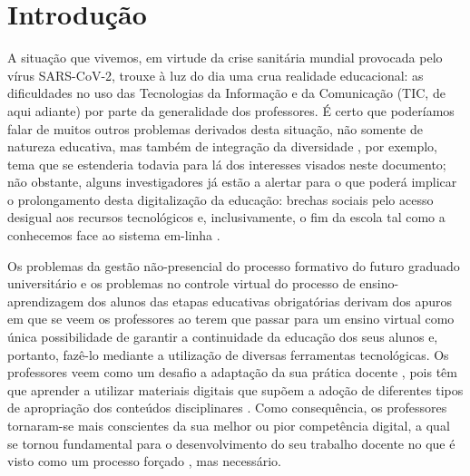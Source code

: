 \documentclass{textolivre}
\begin{document}
\section{Introdução}\label{sec-intro}
A situação que vivemos, em virtude da crise sanitária mundial provocada pelo
vírus SARS-CoV-2, trouxe à luz do dia uma crua realidade educacional: as
dificuldades no uso das Tecnologias da Informação e da Comunicação (TIC, de
aqui adiante) por parte da generalidade dos professores. É certo que poderíamos
falar de muitos outros problemas derivados desta situação, não somente de
natureza educativa, mas também de integração da diversidade \cite{rodriguezdelrincon2020},
por exemplo, tema que se estenderia todavia para lá dos interesses visados
neste documento; não obstante, alguns investigadores já estão a alertar para o
que poderá implicar o prolongamento desta digitalização da educação: brechas
sociais pelo acesso desigual aos recursos tecnológicos \cite{almazan2020,jimenez2020,rogerogarcia2020}
e, inclusivamente, o fim da escola tal como a
conhecemos face ao sistema em-linha \cite{feitoAlonso2020}.

Os problemas da gestão não-presencial do processo formativo do futuro graduado
universitário e os problemas no controle virtual do processo de
ensino-aprendizagem dos alunos das etapas educativas obrigatórias derivam dos
apuros em que se veem os professores ao terem que passar para um ensino virtual
como única possibilidade de garantir a continuidade da educação dos seus alunos
\cite{gomezgerdel2020} e, portanto, fazê-lo mediante a utilização de diversas
ferramentas tecnológicas. Os professores veem como um desafio a adaptação da
sua prática docente \cite{colasbravo2017,sanchezmendila2020}, pois têm que aprender a
utilizar materiais digitais que supõem a adoção de diferentes tipos de
apropriação dos conteúdos disciplinares \cite{CaramsBeltrn2019}.
Como consequência, os professores tornaram-se mais conscientes da sua melhor ou
pior competência digital, a qual se tornou fundamental para o desenvolvimento
do seu trabalho docente \cite{trujillo2020,resolucion2020} no
que é visto como um processo forçado \cite{villafuerte2020},
mas necessário.
\end{document}
